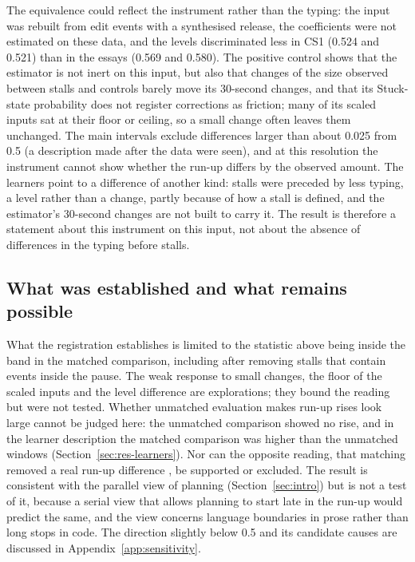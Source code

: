 The equivalence could reflect the instrument rather than the typing: the input was rebuilt from edit events with a
synthesised release, the coefficients were not estimated on these data, and the levels discriminated less in CS1 (0.524
and 0.521) than in the essays (0.569 and 0.580). The positive control shows that the estimator is not inert on this
input, but also that changes of the size observed between stalls and controls barely move its 30-second changes, and
that its Stuck-state probability does not register corrections as friction; many of its scaled inputs sat at their
floor or ceiling, so a small change often leaves them unchanged. The main intervals exclude differences larger than
about 0.025 from 0.5 (a description made after the data were seen), and at this resolution the instrument cannot show
whether the run-up differs by the observed amount. The learners point to a difference of another kind: stalls were
preceded by less typing, a level rather than a change, partly because of how a stall is defined, and the estimator's
30-second changes are not built to carry it. The result is therefore a
statement about this instrument on this input, not about the absence of differences in the typing before stalls.

\subsection{What was established and what remains possible}

What the registration establishes is limited to the statistic above being inside the band in the matched comparison,
including after removing stalls that contain events inside the pause. The weak response to small changes, the floor of
the scaled inputs and the level difference are explorations; they bound the reading but were not tested. Whether unmatched evaluation makes run-up rises look large
cannot be judged here: the unmatched comparison showed no rise, and in the learner description the matched comparison
was higher than the unmatched windows (Section~\ref{sec:res-learners}). Nor can the opposite reading, that matching
removed a real run-up difference \cite{mansournia2018case}, be supported or excluded. The result is consistent with the
parallel view of planning (Section~\ref{sec:intro}) but is not a test of it, because a serial view that allows planning
to start late in the run-up would predict the same, and the view concerns language boundaries in prose rather than long
stops in code. The direction slightly below 0.5 and its candidate causes are
discussed in Appendix~\ref{app:sensitivity}.

